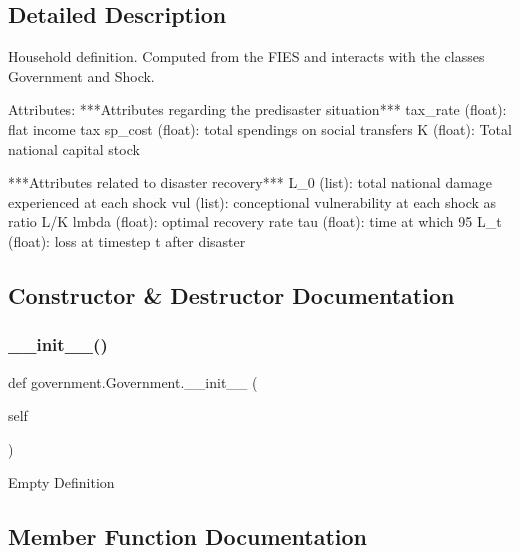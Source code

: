 \subsection{Detailed Description}
\begin{DoxyVerb}Household definition. Computed from the FIES and interacts with the classes
Government and Shock.

Attributes:
    ***Attributes regarding the predisaster situation***
    tax_rate (float): flat income tax
    sp_cost (float): total spendings on social transfers
    K (float): Total national capital stock

    ***Attributes related to disaster recovery***
    L_0 (list): total national damage experienced at each shock
    vul (list): conceptional vulnerability at each shock as ratio L/K
    lmbda (float): optimal recovery rate
    tau (float): time at which 95%
    L_t (float): loss at timestep t after disaster
\end{DoxyVerb}
 

\subsection{Constructor \& Destructor Documentation}
\mbox{\label{classgovernment_1_1Government_a20d7e7f64fa8fed27b63ace640f38065}} 
\subsubsection{\texorpdfstring{\+\_\+\+\_\+init\+\_\+\+\_\+()}{\_\_init\_\_()}}
{\footnotesize\ttfamily def government.\+Government.\+\_\+\+\_\+init\+\_\+\+\_\+ (\begin{DoxyParamCaption}\item[{}]{self }\end{DoxyParamCaption})}

\begin{DoxyVerb}Empty Definition\end{DoxyVerb}
 

\subsection{Member Function Documentation}
\mbox{\label{classgovernment_1_1Government_adc27c11d09806596774abc2b4e786cc4}} 
